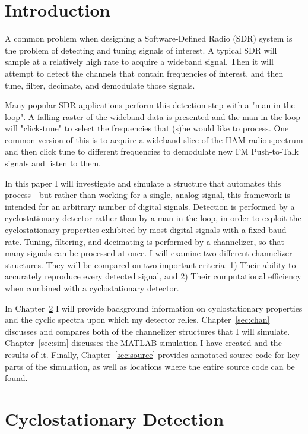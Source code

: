 \documentclass[12pt,dvips]{report}
\begin{document}
\chapter{Introduction}
\label{sec:intro}

A common problem when designing a Software-Defined Radio (SDR) system is the problem of detecting and tuning signals of interest. A typical SDR will sample at a relatively high rate to acquire a wideband signal. Then it will attempt to detect the channels that contain frequencies of interest, and then tune, filter, decimate, and demodulate those signals. 

Many popular SDR applications perform this detection step with a "man in the loop".  A falling raster of the wideband data is presented and the man in the loop will "click-tune" to select  the frequencies that (s)he would like to process. One common version of this is to acquire a wideband slice of the HAM radio spectrum and then click tune to different frequencies to demodulate new FM Push-to-Talk signals and listen to them.

In this paper I will investigate and simulate a structure that automates this process - but rather than working for a single, analog signal, this framework is intended for an arbitrary number of digital signals. Detection is performed by a cyclostationary detector rather than by a man-in-the-loop, in order to exploit the cyclostationary properties exhibited by most digital signals with a fixed baud rate.  Tuning, filtering, and decimating is performed by a channelizer, so that many signals can be processed at once.  I will examine two different channelizer structures. They will be compared on two important criteria: 1) Their ability to accurately reproduce every detected signal, and 2) Their computational efficiency when combined with a cyclostationary detector.

In Chapter~\ref{sec:cyclo} I will provide background information on cyclostationary properties and the cyclic spectra upon which my detector relies.  Chapter~\ref{sec:chan} discusses and compares both of the channelizer structures that I will simulate. Chapter~\ref{sec:sim}  discusses the MATLAB simulation I have created and the results of it. Finally, Chapter~\ref{sec:source} provides annotated source code for key parts of the simulation, as well as locations where the entire source code can be found.

\chapter{Cyclostationary Detection}
\label{sec:cyclo}
\end{document}
